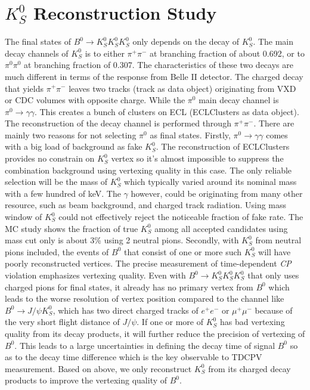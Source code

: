 \chapter{$K_S^0$ Reconstruction Study}

The final states of $B^0 \to K_S^0  K_S^0  K_S^0 $ only depends on the decay of $K_S^0$. The main decay channels of $K_S^0$ is to either $\pi^+ \pi^-$ at branching fraction of about 0.692, or to $\pi^0 \pi^0$ at branching fraction of 0.307. The characteristics of these two decays are much different in terms of the response from Belle II detector. The charged decay that yields  $\pi^+ \pi^-$ leaves two tracks (track as data object) originating from VXD or CDC volumes with opposite charge. While the $\pi^0$ main decay channel is $\pi^0 \to \gamma \gamma$. This creates a bunch of clusters on ECL (ECLClusters as data object). The reconstruction of the decay channel is performed through  $\pi^+ \pi^-$. There are mainly two reasons for not selecting $\pi^0$ as final states.
 Firstly, $\pi^0 \to \gamma \gamma$ comes with a big load of background as fake $K_S^0$. The reconstruction of ECLClusters provides no constrain on $K_S^0$ vertex so it's almost impossible to suppress the combination background using vertexing quality in this case. The only reliable selection will be the mass of $K_S^0$ which typically varied around its nominal mass with a few hundred of keV. 
 The $\gamma$ however, could be originating from many other resource, such as beam background, and charged track radiation. Using mass window of $K_S^0$ could not effectively reject the noticeable fraction of fake rate. The MC study shows the fraction of true $K_S^0$ among all accepted candidates using mass cut only is about 3\% using 2 neutral pions.  Secondly, with $K_S^0$ from neutral pions  included, the events of $B^0$ that consist of one or more such $K_S^0$ will have poorly reconstructed vertices. The precise measurement of time-dependent \textit{CP} violation emphasizes vertexing quality. Even with $B^0 \to K_S^0  K_S^0  K_S^0 $ that only uses charged pions for final states, it already has no primary vertex from $B^0$ which leads to the worse resolution of vertex position compared to the channel like $B^0 \to J/\psi K_S^0$, which has two direct charged tracks of $e^+e^-$ or $\mu^+ \mu^-$  because of the very short flight distance of $J/\psi$. If one or more of $K^0_S$ has bad vertexing quality from its decay products, it will further reduce the precision of vertexing of $B^0$. This leads to a large uncertainties in defining the decay time of signal $B^0$ so as to the decay time difference which is the key observable to TDCPV measurement. Based on above, we only reconstruct $K_S^0$ from its charged decay products to improve the vertexing quality of $B^0$.
 
